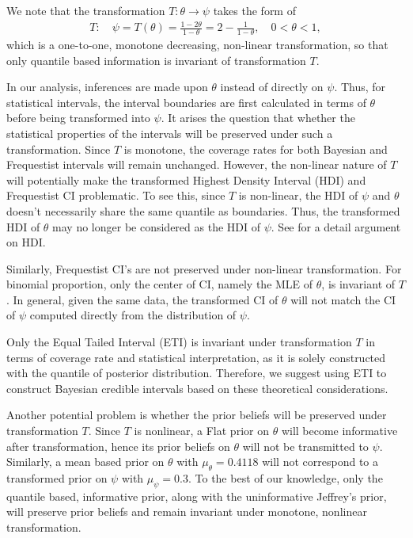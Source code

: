 \documentclass[12pt]{amsart}
\begin{document}
We note that the transformation $T: \theta \to \psi$ takes the form of 
\begin{align}
    T: \quad \psi = T(\theta) = \frac{1 - 2\theta }{1 - \theta} = 2 - \frac{1}{1 - \theta}, \quad 0 < \theta < 1,
\end{align}
which is a one-to-one, monotone decreasing, non-linear transformation, so that only quantile based information is invariant of transformation $T$. 

In our analysis, inferences are made upon $\theta$ instead of directly on $\psi$. Thus, for statistical intervals, the interval boundaries are first calculated in terms of $\theta$ before being transformed into $\psi$. It arises the question that whether the statistical properties of the intervals will be preserved under such a transformation. Since $T$ is monotone, the coverage rates for both Bayesian and Frequestist intervals will remain unchanged. However, the non-linear nature of $T$ will potentially make the transformed Highest Density Interval (HDI) and Frequestist CI problematic. To see this, since $T$ is non-linear, the HDI of $\psi$ and $\theta$ doesn't necessarily share the same quantile as boundaries. Thus, the transformed HDI of $\theta$ may no longer be considered as the HDI of $\psi$. See \cite{jags} for a detail argument on HDI. 

Similarly, Frequestist CI's are not preserved under non-linear transformation. For binomial proportion, only the center of CI, namely the MLE of $\theta$, is invariant of $T$. In general, given the same data, the transformed CI of $\theta$ will not match the CI of $\psi$ computed directly from the distribution of $\psi$. 

Only the Equal Tailed Interval (ETI) is invariant under transformation $T$ in terms of coverage rate and statistical interpretation, as it is solely constructed with the quantile of posterior distribution. Therefore, we suggest using ETI to construct Bayesian credible intervals based on these theoretical considerations.

Another potential problem is whether the prior beliefs will be preserved under transformation $T$. Since $T$ is nonlinear, a Flat prior on $\theta$ will become informative after transformation, hence its prior beliefs on $\theta$ will not be transmitted to $\psi$. Similarly, a mean based prior on $\theta$ with $\mu_\theta = 0.4118$ will not correspond to a transformed prior on $\psi$ with $\mu_\psi = 0.3$. To the best of our knowledge, only the quantile based, informative prior, along with the uninformative Jeffrey's prior, will preserve prior beliefs and remain invariant under monotone, nonlinear transformation.
\end{document}

